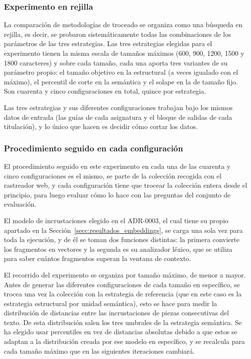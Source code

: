 \subsubsection[Experimento en rejilla]{Experimento en rejilla}
\label{secc:rejilla_fragmentacion}

La comparación de metodologías de troceado se organiza como una búsqueda en rejilla, es decir, se probaron sistemáticamente todas las combinaciones de los parámetros de las tres estrategias. Las tres estrategias elegidas para el experimento tienen la misma escala de tamaños máximos (600, 900, 1200, 1500 y 1800 caracteres) y sobre cada tamaño, cada una aporta tres variantes de su parámetro propio: el tamaño objetivo en la estructural (a veces igualado con el máximo), el percentil de corte en la semántica y el solape en la de tamaño fijo. Son cuarenta y cinco configuraciones en total, quince por estrategia.

Las tres estrategias y sus diferentes configuraciones trabajan bajo los mismos datos de entrada (las guías de cada asignatura y el bloque de salidas de cada titulación), y lo único que hacen es decidir cómo cortar los datos.

\subsubsection[Procedimiento seguido en cada configuración]{Procedimiento seguido en cada configuración}
\label{secc:rejilla_procedimiento}

El procedimiento seguido en este experimento en cada una de las cuarenta y cinco configuraciones es el mismo, se parte de la colección recogida con el rastreador web, y cada configuración tiene que trocear la colección entera desde el principio, para luego evaluar cómo lo hace con las preguntas del conjunto de evaluación.

El modelo de incrustaciones elegido en el ADR-0003, el cual tiene su propio apartado en la Sección~\ref{secc:resultados_embeddings}, se carga una sola vez para toda la
ejecución, y de él se toman dos funciones distintas: la primera convierte los fragmentos en vectores y la segunda es su analizador léxico, que se utiliza para saber cuántos fragmentos superan la ventana de contexto. 

El recorrido del experimento se organiza por tamaño máximo, de menor a mayor. Antes de generar las diferentes configuraciones de cada tamaño en específico, se trocea una vez la colección con la estrategia de referencia (que en este caso es la estrategia estructural por unidad semántica), esto se hace para medir la distribución de distancias entre las incrustaciones de piezas consecutivas del texto. De esta distribución salen los tres umbrales de la estrategia semántica. Se ha elegido usar percentiles en vez de distancias absolutas debido a que estos se adaptan a la distribución creada por ese modelo en específico, y se recalcula para cada tamaño máximo que en las siguientes iteraciones cambiará.

